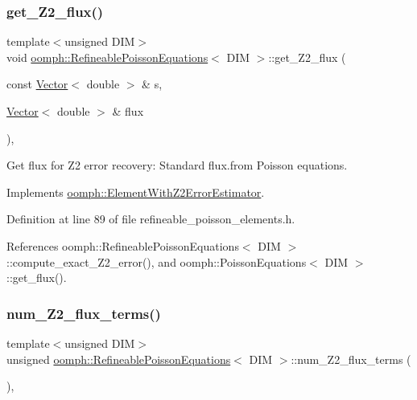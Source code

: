 \subsubsection{\texorpdfstring{get\+\_\+\+Z2\+\_\+flux()}{get\_Z2\_flux()}}
{\footnotesize\ttfamily template$<$unsigned D\+IM$>$ \\
void \hyperlink{classoomph_1_1RefineablePoissonEquations}{oomph\+::\+Refineable\+Poisson\+Equations}$<$ D\+IM $>$\+::get\+\_\+\+Z2\+\_\+flux (\begin{DoxyParamCaption}\item[{const \hyperlink{classoomph_1_1Vector}{Vector}$<$ double $>$ \&}]{s,  }\item[{\hyperlink{classoomph_1_1Vector}{Vector}$<$ double $>$ \&}]{flux }\end{DoxyParamCaption})\hspace{0.3cm}{\ttfamily [inline]}, {\ttfamily [virtual]}}



Get \textquotesingle{}flux\textquotesingle{} for Z2 error recovery\+: Standard flux.\+from Poisson equations. 



Implements \hyperlink{classoomph_1_1ElementWithZ2ErrorEstimator_a5688ff5f546d81771cabad82ca5a7556}{oomph\+::\+Element\+With\+Z2\+Error\+Estimator}.



Definition at line 89 of file refineable\+\_\+poisson\+\_\+elements.\+h.



References oomph\+::\+Refineable\+Poisson\+Equations$<$ D\+I\+M $>$\+::compute\+\_\+exact\+\_\+\+Z2\+\_\+error(), and oomph\+::\+Poisson\+Equations$<$ D\+I\+M $>$\+::get\+\_\+flux().

\mbox{\label{classoomph_1_1RefineablePoissonEquations_ab778ee621a1e0fc89f10533134a6f825}} 
\subsubsection{\texorpdfstring{num\+\_\+\+Z2\+\_\+flux\+\_\+terms()}{num\_Z2\_flux\_terms()}}
{\footnotesize\ttfamily template$<$unsigned D\+IM$>$ \\
unsigned \hyperlink{classoomph_1_1RefineablePoissonEquations}{oomph\+::\+Refineable\+Poisson\+Equations}$<$ D\+IM $>$\+::num\+\_\+\+Z2\+\_\+flux\+\_\+terms (\begin{DoxyParamCaption}{ }\end{DoxyParamCaption})\hspace{0.3cm}{\ttfamily [inline]}, {\ttfamily [virtual]}}



